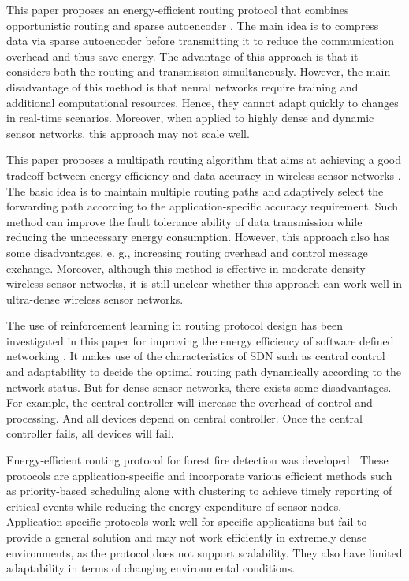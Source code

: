 \documentclass[a4paper,fleqn]{cas-dc}
\numberwithin{equation}{section}
\begin{document}
This paper proposes an energy-efficient routing protocol that combines opportunistic routing and sparse autoencoder \cite{Raj2024122}. The main idea is to compress data via sparse autoencoder before transmitting it to reduce the communication overhead and thus save energy. The advantage of this approach is that it considers both the routing and transmission simultaneously. However, the main disadvantage of this method is that neural networks require training and additional computational resources. Hence, they cannot adapt quickly to changes in real-time scenarios. Moreover, when applied to highly dense and dynamic sensor networks, this approach may not scale well.

This paper proposes a multipath routing algorithm that aims at achieving a good tradeoff between energy efficiency and data accuracy in wireless sensor networks \cite{Dan2024}. The basic idea is to maintain multiple routing paths and adaptively select the forwarding path according to the application-specific accuracy requirement. Such method can improve the fault tolerance ability of data transmission while reducing the unnecessary energy consumption. However, this approach also has some disadvantages, e. g., increasing routing overhead and control message exchange. Moreover, although this method is effective in moderate-density wireless sensor networks, it is still unclear whether this approach can work well in ultra-dense wireless sensor networks.

The use of reinforcement learning in routing protocol design has been investigated in this paper for improving the energy efficiency of software defined networking \cite{Godfrey2023}. It makes use of the characteristics of SDN such as central control and adaptability to decide the optimal routing path dynamically according to the network status. But for dense sensor networks, there exists some disadvantages. For example, the central controller will increase the overhead of control and processing. And all devices depend on central controller. Once the central controller fails, all devices will fail.

Energy-efficient routing protocol for forest fire detection was developed \cite{Pedditi2023}. These protocols are application-specific and incorporate various efficient methods such as priority-based scheduling along with clustering to achieve timely reporting of critical events while reducing the energy expenditure of sensor nodes. Application-specific protocols work well for specific applications but fail to provide a general solution and may not work efficiently in extremely dense environments, as the protocol does not support scalability. They also have limited adaptability in terms of changing environmental conditions.
\end{document}
